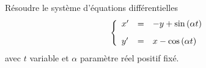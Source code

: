 \documentclass[a4paper, 11pt,reqno]{article}
\begin{document}



\begin{exercice}  \;
R\'esoudre le syst\`eme d'\'equations diff\'erentielles
$$\left\lbrace\begin{array}{lll} x^{\prime}&=& -y+\sin{(\alpha t)}\vsec\\y^{\prime}&=& x-\cos{(\alpha t)}     \end{array}\right.$$
avec $t$ variable et $\alpha$ param\`etre r\'eel positif fix\'e.
\end{exercice}
\end{document}
